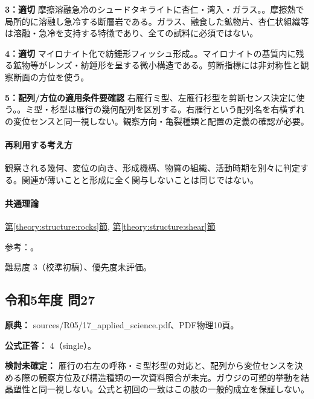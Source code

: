 \noindent\textbf{3：適切} 摩擦溶融急冷のシュードタキライトに杏仁・湾入・ガラス。。摩擦熱で局所的に溶融し急冷する断層岩である。ガラス、融食した鉱物片、杏仁状組織等は溶融・急冷を支持する特徴であり、全ての試料に必須ではない。\par

\noindent\textbf{4：適切} マイロナイト化で紡錘形フィッシュ形成。。マイロナイトの基質内に残る鉱物等がレンズ・紡錘形を呈する微小構造である。剪断指標には非対称性と観察断面の方位を使う。\par

\noindent\textbf{5：配列/方位の適用条件要確認} 右雁行ミ型、左雁行杉型を剪断センス決定に使う。。ミ型・杉型は雁行の幾何配列を区別する。右雁行という配列名を右横ずれの変位センスと同一視しない。観察方向・亀裂種類と配置の定義の確認が必要。\par

\paragraph{再利用する考え方} 観察される幾何、変位の向き、形成機構、物質の組織、活動時期を別々に判定する。関連が薄いことと形成に全く関与しないことは同じではない。

\paragraph{共通理論} \hyperref[theory:structure:rocks]{第\ref*{theory:structure:rocks}節}, \hyperref[theory:structure:shear]{第\ref*{theory:structure:shear}節}

\par 参考：\cite{str_faultrocks,str_shear}。

\par 難易度 3（校準初稿）、優先度未評価。

\subsection{令和5年度 問27}
\label{q:r05-reg-applied-27}

\noindent\textbf{原典：} sources/R05/17\_applied\_science.pdf、PDF物理10頁。

\textbf{公式正答：} 4（single）。

\par\textbf{検討未確定：} 雁行の右左の呼称・ミ型杉型の対応と、配列から変位センスを決める際の観察方位及び構造種類の一次資料照合が未完。ガウジの可塑的挙動を結晶塑性と同一視しない。公式と初回の一致はこの肢の一般的成立を保証しない。

